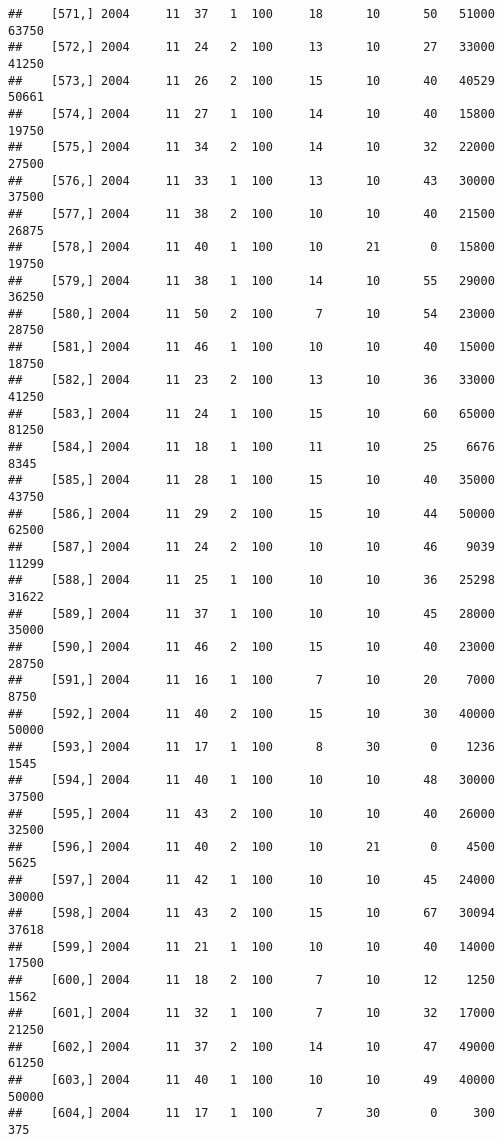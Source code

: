 \documentclass{article}\usepackage[]{graphicx}\usepackage[]{color}
\makeatletter
\newenvironment{kframe}{%
 \def\at@end@of@kframe{}%
 \ifinner\ifhmode%
  \def\at@end@of@kframe{\end{minipage}}%
  \begin{minipage}{\columnwidth}%
 \fi\fi%
 \def\FrameCommand##1{\hskip\@totalleftmargin \hskip-\fboxsep
 \colorbox{shadecolor}{##1}\hskip-\fboxsep
     \hskip-\linewidth \hskip-\@totalleftmargin \hskip\columnwidth}%
 \MakeFramed {\advance\hsize-\width
   \@totalleftmargin\z@ \linewidth\hsize
   \@setminipage}}%
 {\par\unskip\endMakeFramed%
 \at@end@of@kframe}
\newenvironment{knitrout}{}{} %
\makeatother
\begin{document}
\begin{knitrout}
\begin{kframe}
\begin{verbatim}
##    [571,] 2004     11  37   1  100     18      10      50   51000   63750
##    [572,] 2004     11  24   2  100     13      10      27   33000   41250
##    [573,] 2004     11  26   2  100     15      10      40   40529   50661
##    [574,] 2004     11  27   1  100     14      10      40   15800   19750
##    [575,] 2004     11  34   2  100     14      10      32   22000   27500
##    [576,] 2004     11  33   1  100     13      10      43   30000   37500
##    [577,] 2004     11  38   2  100     10      10      40   21500   26875
##    [578,] 2004     11  40   1  100     10      21       0   15800   19750
##    [579,] 2004     11  38   1  100     14      10      55   29000   36250
##    [580,] 2004     11  50   2  100      7      10      54   23000   28750
##    [581,] 2004     11  46   1  100     10      10      40   15000   18750
##    [582,] 2004     11  23   2  100     13      10      36   33000   41250
##    [583,] 2004     11  24   1  100     15      10      60   65000   81250
##    [584,] 2004     11  18   1  100     11      10      25    6676    8345
##    [585,] 2004     11  28   1  100     15      10      40   35000   43750
##    [586,] 2004     11  29   2  100     15      10      44   50000   62500
##    [587,] 2004     11  24   2  100     10      10      46    9039   11299
##    [588,] 2004     11  25   1  100     10      10      36   25298   31622
##    [589,] 2004     11  37   1  100     10      10      45   28000   35000
##    [590,] 2004     11  46   2  100     15      10      40   23000   28750
##    [591,] 2004     11  16   1  100      7      10      20    7000    8750
##    [592,] 2004     11  40   2  100     15      10      30   40000   50000
##    [593,] 2004     11  17   1  100      8      30       0    1236    1545
##    [594,] 2004     11  40   1  100     10      10      48   30000   37500
##    [595,] 2004     11  43   2  100     10      10      40   26000   32500
##    [596,] 2004     11  40   2  100     10      21       0    4500    5625
##    [597,] 2004     11  42   1  100     10      10      45   24000   30000
##    [598,] 2004     11  43   2  100     15      10      67   30094   37618
##    [599,] 2004     11  21   1  100     10      10      40   14000   17500
##    [600,] 2004     11  18   2  100      7      10      12    1250    1562
##    [601,] 2004     11  32   1  100      7      10      32   17000   21250
##    [602,] 2004     11  37   2  100     14      10      47   49000   61250
##    [603,] 2004     11  40   1  100     10      10      49   40000   50000
##    [604,] 2004     11  17   1  100      7      30       0     300     375

\end{verbatim}
\end{kframe}
\end{knitrout}
\end{document}

